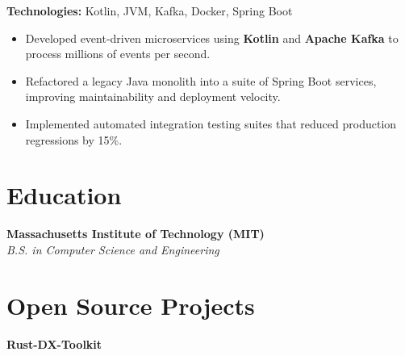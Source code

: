 \documentclass[11pt,letterpaper]{article}
\begin{document}
        {\footnotesize\color{accentcolor}\textbf{Technologies:} Kotlin, JVM, Kafka, Docker, Spring Boot } \\
    
    
    
        \begin{itemize}[label=\textbullet]
        
            \item
            
                Developed event-driven microservices using \textbf{Kotlin} and \textbf{Apache Kafka} to process millions of events per second.
            
            
            
        
            \item
            
                Refactored a legacy Java monolith into a suite of Spring Boot services, improving maintainability and deployment velocity.
            
            
            
        
            \item
            
                Implemented automated integration testing suites that reduced production regressions by 15\%.
            
            
            
        
        \end{itemize}
    
    \vspace{6pt}




\section{Education}
\noindent\textbf{Massachusetts Institute of Technology (MIT)} \\
\textit{B.S. in Computer Science and Engineering}





\section{Open Source Projects}

    \noindent
    \textbf{Rust-DX-Toolkit}
    \hfill 
    
\end{document}
